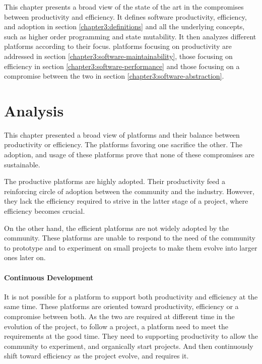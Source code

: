 This chapter presents a broad view of the state of the art in the compromises between productivity and efficiency.
It defines software productivity, efficiency, and adoption in section \ref{chapter3:definitions} and all the underlying concepts, such as higher order programming and state mutability.
It then analyzes different platforms according to their focus. platforms focusing on productivity are addressed in section \ref{chapter3:software-maintainability}, those focusing on efficiency in section \ref{chapter3:software-performance} and those focusing on a compromise between the two in section \ref{chapter3:software-abstraction}.









\section{Analysis}

This chapter presented a broad view of platforms and their balance between productivity or efficiency.
The platforms favoring one sacrifice the other.
The adoption, and usage of these platforms prove that none of these compromises are sustainable.

The productive platforms are highly adopted.
Their productivity feed a reinforcing circle of adoption between the community and the industry.
However, they lack the efficiency required to strive in the latter stage of a project, where efficiency becomes crucial.

On the other hand, the efficient platforms are not widely adopted by the community.
These platforms are unable to respond to the need of the community to prototype and to experiment on small projects to make them evolve into larger ones later on.


\paragraph{Continuous Development}

It is not possible for a platform to support both productivity and efficiency at the same time.
These platforms are oriented toward productivity, efficiency or a compromise between both.
As the two are required at different time in the evolution of the project, to follow a project, a platform need to meet the requirements at the good time.
They need to supporting productivity to allow the community to experiment, and organically start projects.
And then continuously shift toward efficiency as the project evolve, and requires it.

